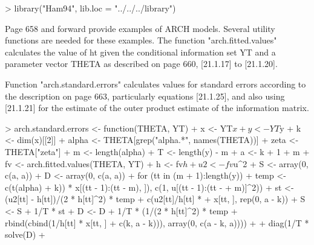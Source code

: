 \begin{Schunk}
\begin{Sinput}
> library("Ham94", lib.loc = "../../../library")
\end{Sinput}
\end{Schunk}
Page 658 and forward provide examples of ARCH models.  Several utility functions are needed for these examples.
The function "arch.fitted.values" calculates the value of ht given the conditional information set YT and
a parameter vector THETA as described on page 660, [21.1.17] to [21.1.20].
\begin{Schunk}
\end{Schunk}
Function "arch.standard.errors" calculates values for standard errors according to the description on page 663,
particularly equations [21.1.25], and also using [21.1.21] for the estimate of the outer product estimate of the
information matrix.
\begin{Schunk}
\begin{Sinput}
> arch.standard.errors <- function(THETA, YT) {
+     x <- YT$x
+     y <- YT$y
+     k <- dim(x)[[2]]
+     alpha <- THETA[grep("alpha.*", names(THETA))]
+     zeta <- THETA["zeta"]
+     m <- length(alpha)
+     T <- length(y) - m
+     a <- k + 1 + m
+     fv <- arch.fitted.values(THETA, YT)
+     h <- fv$h
+     u2 <- fv$u^2
+     S <- array(0, c(a, a))
+     D <- array(0, c(a, a))
+     for (tt in (m + 1):length(y)) {
+         temp <- c(t(alpha) %
+             k)) * x[(tt - 1):(tt - m), ]), c(1, u[(tt - 1):(tt - 
+             m)]^2))
+         st <- (u2[tt] - h[tt])/(2 * h[tt]^2) * temp + c(u2[tt]/h[tt] * 
+             x[tt, ], rep(0, a - k))
+         S <- S + 1/T * st %
+         D <- D + 1/T * (1/(2 * h[tt]^2) * temp %
+             rbind(cbind(1/h[tt] * x[tt, ] %
+                 c(k, a - k))), array(0, c(a - k, a))))
+     }
+     diag(1/T * solve(D) %
+ }
\end{Sinput}
\end{Schunk}
